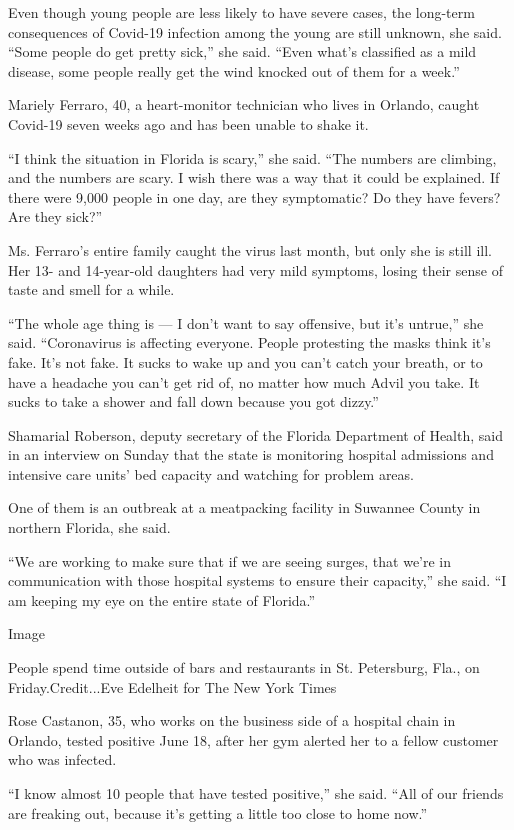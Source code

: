 Even though young people are less likely to have severe cases, the
long-term consequences of Covid-19 infection among the young are still
unknown, she said. ``Some people do get pretty sick,'' she said. ``Even
what's classified as a mild disease, some people really get the wind
knocked out of them for a week.''

Mariely Ferraro, 40, a heart-monitor technician who lives in Orlando,
caught Covid-19 seven weeks ago and has been unable to shake it.

``I think the situation in Florida is scary,'' she said. ``The numbers
are climbing, and the numbers are scary. I wish there was a way that it
could be explained. If there were 9,000 people in one day, are they
symptomatic? Do they have fevers? Are they sick?''

Ms. Ferraro's entire family caught the virus last month, but only she is
still ill. Her 13- and 14-year-old daughters had very mild symptoms,
losing their sense of taste and smell for a while.

``The whole age thing is --- I don't want to say offensive, but it's
untrue,'' she said. ``Coronavirus is affecting everyone. People
protesting the masks think it's fake. It's not fake. It sucks to wake up
and you can't catch your breath, or to have a headache you can't get rid
of, no matter how much Advil you take. It sucks to take a shower and
fall down because you got dizzy.''

Shamarial Roberson, deputy secretary of the Florida Department of
Health, said in an interview on Sunday that the state is monitoring
hospital admissions and intensive care units' bed capacity and watching
for problem areas.

One of them is an outbreak at a meatpacking facility in Suwannee County
in northern Florida, she said.

``We are working to make sure that if we are seeing surges, that we're
in communication with those hospital systems to ensure their capacity,''
she said. ``I am keeping my eye on the entire state of Florida.''

Image

People spend time outside of bars and restaurants in St. Petersburg,
Fla., on Friday.Credit...Eve Edelheit for The New York Times

Rose Castanon, 35, who works on the business side of a hospital chain in
Orlando, tested positive June 18, after her gym alerted her to a fellow
customer who was infected.

``I know almost 10 people that have tested positive,'' she said. ``All
of our friends are freaking out, because it's getting a little too close
to home now.''

